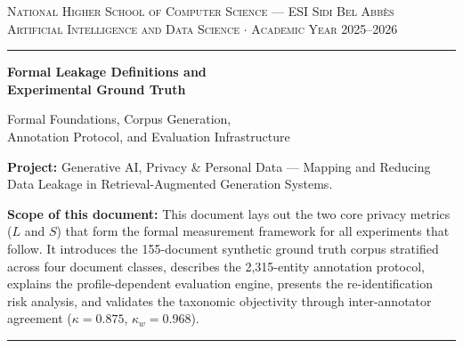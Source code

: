 \documentclass[12pt, a4paper]{article}
\begin{document}


\begin{titlepage}
\begin{center}

\vspace*{1.2cm}

{\small\color{steel}\textsc{National Higher School of Computer Science --- ESI Sidi Bel Abb\`{e}s}}\\[0.15cm]
{\small\color{steel}\textsc{Artificial Intelligence and Data Science $\cdot$ Academic Year 2025--2026}}

\vspace{0.5cm}
{\color{navy}\rule{\textwidth}{1.2pt}}
\vspace{1.6cm}

{\color{navy}\Huge\bfseries Formal Leakage Definitions and\\[0.3cm] Experimental Ground Truth}

\vspace{0.8cm}

{\color{steel}\large Formal Foundations, Corpus Generation,\\[0.1cm]
Annotation Protocol, and Evaluation Infrastructure}

\vspace{2cm}

\begin{prosebox}
{\small\textbf{Project:} Generative AI, Privacy \& Personal Data --- Mapping and Reducing Data Leakage in Retrieval-Augmented Generation Systems.

\medskip
\textbf{Scope of this document:} This document lays out the two core privacy metrics ($L$ and $S$) that form the formal measurement framework for all experiments that follow. It introduces the 155-document synthetic ground truth corpus stratified across four document classes, describes the 2{,}315-entity annotation protocol, explains the profile-dependent evaluation engine, presents the re-identification risk analysis, and validates the taxonomic objectivity through inter-annotator agreement ($\kappa = 0.875$, $\kappa_w = 0.968$).}
\end{prosebox}

\vfill
{\color{navy}\rule{\textwidth}{1.2pt}}

\end{center}
\end{titlepage}

\newpage
\tableofcontents
\newpage
\end{document}
